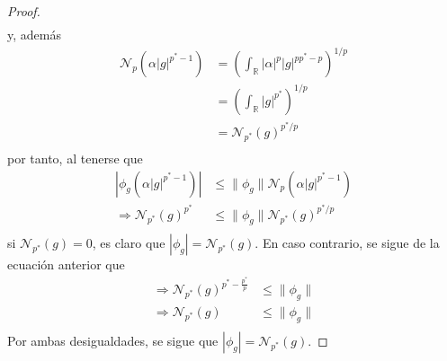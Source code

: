 \documentclass[12pt]{report}
\newcounter{it}
\theoremstyle{largebreak}
\newcommand\abs[1]{\ensuremath{\left|#1\right|}}
\newcommand{\N}[2]{\ensuremath{\mathcal{N}_{#1}\left(#2\right)}}
\begin{document}
\begin{proof}
\begin{equation*}
\begin{split}
            \end{split}
        \end{equation*}
        y, además
        \begin{equation*}
            \begin{split}
                \N{p}{\alpha\abs{g}^{p^*-1}}&=\left(\int_{\mathbb{R}}\abs{\alpha}^p\abs{g}^{pp^*-p} \right)^{1/p}\\
                &=\left(\int_{\mathbb{R}}\abs{g}^{p^*} \right)^{1/p}\\
                &=\N{p^*}{g}^{p^*/p}\\
            \end{split}
        \end{equation*}
        por tanto, al tenerse que
        \begin{equation*}
            \begin{split}
                \abs{\phi_g(\alpha\abs{g}^{p^*-1})}&\leq\|\phi_g\|\N{p}{\alpha\abs{g}^{p^*-1}}\\
                \Rightarrow \N{p^*}{g}^{p^*}&\leq\|\phi_g\|\N{p^*}{g}^{p^*/p}\\
            \end{split}
        \end{equation*}
        si $\N{p^*}{g}=0$, es claro que $\abs{\phi_g}=\N{p^*}{g}$. En caso contrario, se sigue de la ecuación anterior que
        \begin{equation*}
            \begin{split}
                \Rightarrow \N{p^*}{g}^{p^*-\frac{p^*}{p}}&\leq\|\phi_g\|\\
                \Rightarrow \N{p^*}{g}&\leq\|\phi_g\|\\
            \end{split}
        \end{equation*}
        Por ambas desigualdades, se sigue que $\abs{\phi_g}=\N{p^*}{g}$.


\end{proof}
\end{document}
